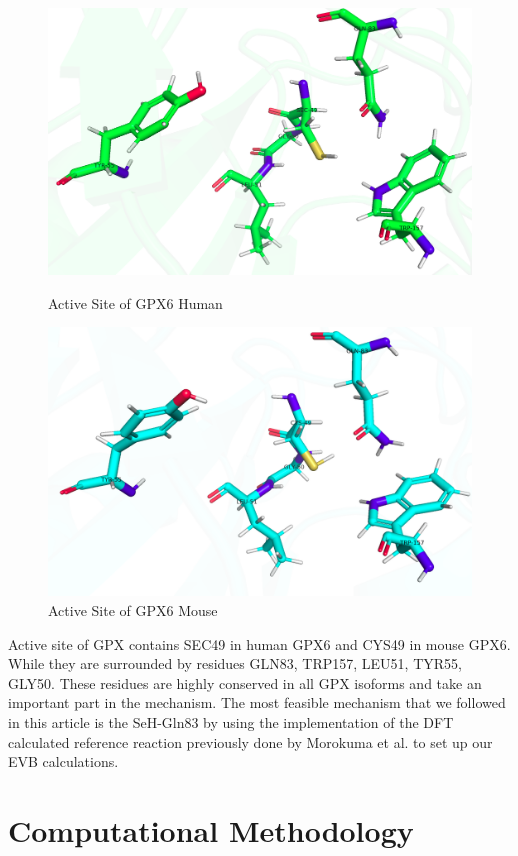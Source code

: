 \documentclass[journal=jacsat,manuscript=article]{achemso}
\begin{document}
{\begin{figure}
\includegraphics[width=0.7\linewidth]{figures/activesite_humansec.png} 
\caption{Active Site of GPX6 Human}
\label{fig:figure4}
\includegraphics[width=0.7\linewidth]{figures/activesite_mousecys.png} 
\caption{Active Site of GPX6 Mouse}
\label{fig:figure5}
\end{figure}

Active site of GPX contains SEC49 in human GPX6 and CYS49 in mouse GPX6. While they are surrounded by residues GLN83, TRP157, LEU51, TYR55, GLY50. These residues are highly conserved in all GPX isoforms and take an important part in the mechanism. The most feasible mechanism that we followed in this article is the SeH-Gln83 by using the implementation of the DFT calculated reference reaction previously done by Morokuma et al. \cite{Prabhakar2006} to set up our EVB calculations.

\section{Computational Methodology}

}
\end{document}
